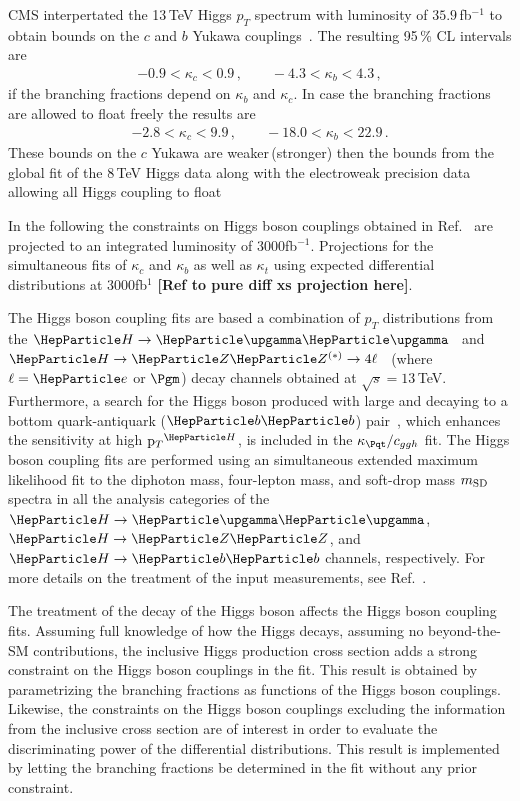 \documentclass[../report.tex]{subfiles}
\begin{document}
CMS interpertated the 13\,TeV Higgs $p_T$ spectrum with luminosity of $35.9\,$fb$^{-1}$ to obtain bounds on the $c$ and $b$ Yukawa couplings~\cite{CMS:2018hhg}. The resulting 95\,\% CL intervals are
%
\begin{align}
    -0.9 < \kappa_c < 0.9 \, ,  \qquad
    -4.3 < \kappa_b < 4.3 \, ,
\end{align}
if the branching fractions  depend on $\kappa_b$ and $\kappa_c$. In case the branching fractions are allowed to float freely the results are
\begin{align}
    -2.8 < \kappa_c < 9.9 \, , \qquad
    -18.0 < \kappa_b < 22.9 \, .
\end{align}
%
These bounds on the $c$ Yukawa are weaker\,(stronger) then the bounds from the global fit of the 8\,TeV Higgs data along with the electroweak precision data allowing all Higgs coupling to float~\cite{Perez:2015aoa}  







In the following the constraints on Higgs boson couplings obtained in Ref.~\cite{CMS-PAS-HIG-17-028} are projected to an integrated luminosity of $3000$fb$^{-1}$.
% 
Projections for the simultaneous fits of $\kappa_c$ and $\kappa_b$ as well as $\kappa_t$  using expected differential distributions at $3000$fb$^{1}$  \textbf{[Ref to pure diff xs projection here]}.



The Higgs boson coupling fits are based a combination of $p_T$ distributions from the $\hgg$~\cite{Sirunyan:2018kta} and $\hzztofourl$~\cite{CMS_AN_2016-442} (where $\ell = \electron$ or $\muon$) decay channels obtained at $\sqrt{s}=13\,$TeV.
% 
Furthermore, a search for the Higgs boson produced with large \pt and decaying to a bottom quark-antiquark ($\bb$) pair~\cite{CMS_AN_2016-366}, which enhances the sensitivity at high $\pth$, is included in the $\kappat/\cg$ fit.
% 
The Higgs boson coupling fits are performed using an simultaneous extended maximum likelihood fit to the diphoton mass, four-lepton mass, and soft-drop mass $m_\text{SD}$~\cite{Dasgupta:2013ihk,Larkoski:2014wba} spectra in all the analysis categories of the $\hgg$, $\hzz$, and $\hbb$ channels, respectively.
% 
For more details on the treatment of the input measurements, see Ref.~\cite{CMS-PAS-HIG-17-028}.



The treatment of the decay of the Higgs boson affects the Higgs boson coupling fits.
% 
Assuming full knowledge of how the Higgs decays, \ie assuming no beyond-the-SM contributions, the inclusive Higgs production cross section adds a strong constraint on the Higgs boson couplings in the fit.
% 
This result is obtained by parametrizing the branching fractions as functions of the Higgs boson couplings.
% 
Likewise, the constraints on the Higgs boson couplings excluding the information from the inclusive cross section are of interest in order to evaluate the discriminating power of the differential distributions.
% 
This result is implemented by letting the branching fractions be determined in the fit without any prior constraint.
\end{document}
